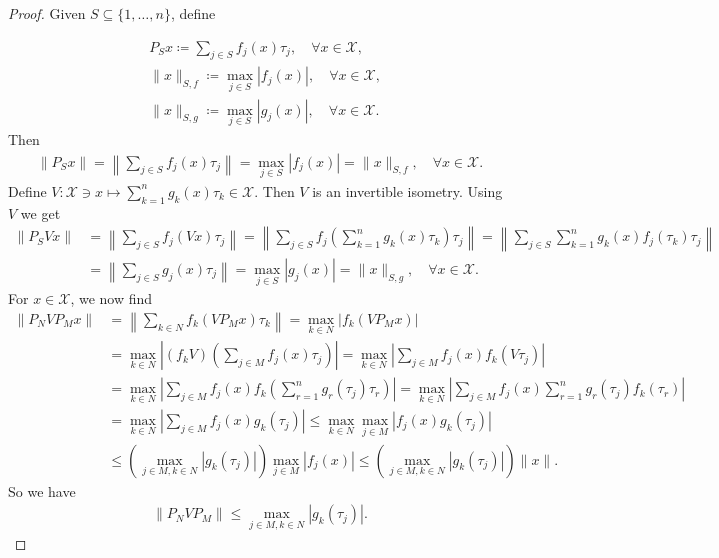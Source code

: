 \documentclass[10pt,a4paper]{amsart}
\begin{document}
\begin{proof}
Given $S\subseteq \{1, \dots, n\}$, define 

\begin{align*}
	&P_Sx\coloneqq \sum_{j\in S}f_j(x)\tau_j, \quad \forall x \in \mathcal{X}, \\
	&\|x\|_{S, f}\coloneqq \displaystyle \max_{j \in S}|f_j(x)|, \quad \forall x \in \mathcal{X},\\
	&\|x\|_{S, g}\coloneqq \displaystyle \max_{j \in S}|g_j(x)|, \quad \forall x \in \mathcal{X}.
\end{align*}
Then 
\begin{align*}
	\|P_Sx\|=\left\|\sum_{j\in S}f_j(x)\tau_j\right\|=\displaystyle \max_{j \in S}|f_j(x)|=	\|x\|_{S, f}, \quad \forall x \in \mathcal{X}.
\end{align*}
Define $V:\mathcal{X}\ni x \mapsto \sum_{k=1}^{n}g_k(x)\tau_k \in \mathcal{X}$. Then $V$ is an invertible isometry. Using $V$ we get 
\begin{align*}
	\|P_SVx\|&=\left\|\sum_{j\in S}f_j(Vx)\tau_j\right\|=\left\|\sum_{j\in S}f_j\left(\sum_{k=1}^{n}g_k(x)\tau_k\right)\tau_j\right\|=\left\|\sum_{j\in S}\sum_{k=1}^{n}g_k(x)f_j(\tau_k)\tau_j\right\|\\
	&=\left\|\sum_{j\in S}g_j(x)\tau_j\right\|=\displaystyle \max_{j \in S}|g_j(x)|=	\|x\|_{S, g}, \quad \forall x \in \mathcal{X}.
\end{align*}
For $x \in \mathcal{X}$, we  now find 
\begin{align*}
	\|P_NVP_Mx\|&=\left\|\sum_{k\in N}f_k(VP_Mx)\tau_k\right\|=\max_{k \in N}|f_k(VP_Mx)|\\
	&=\max_{k \in N}\left|(f_kV) \left(\sum_{j\in M}f_j(x)\tau_j\right)\right|=\max_{k \in N}\left| \sum_{j\in M}f_j(x)f_k(V\tau_j)\right|\\
	&=\max_{k \in N}\left| \sum_{j\in M}f_j(x)f_k\left(\sum_{r=1}^{n}g_r(\tau_j)\tau_r\right)\right|
	=\max_{k \in N}\left| \sum_{j\in M}f_j(x)\sum_{r=1}^{n}g_r(\tau_j)f_k(\tau_r)\right|\\
	&=\max_{k \in N}\left| \sum_{j\in M}f_j(x)g_k(\tau_j)\right|\leq  \max_{k \in N}\max_{j \in M}|f_j(x)g_k(\tau_j)|\\
	&\leq \left(\max_{j \in M, k\in N}|g_k(\tau_j)|\right)\max_{j \in M}|f_j(x)|\leq \left(\max_{j \in M, k\in N}|g_k(\tau_j)|\right)\|x\|.
\end{align*}
So we have 
\begin{align}\label{FPVP}
	\|P_NVP_M\|\leq \displaystyle \max_{j \in M, k\in N}|g_k(\tau_j)|.
\end{align}

\end{proof}
\end{document}
